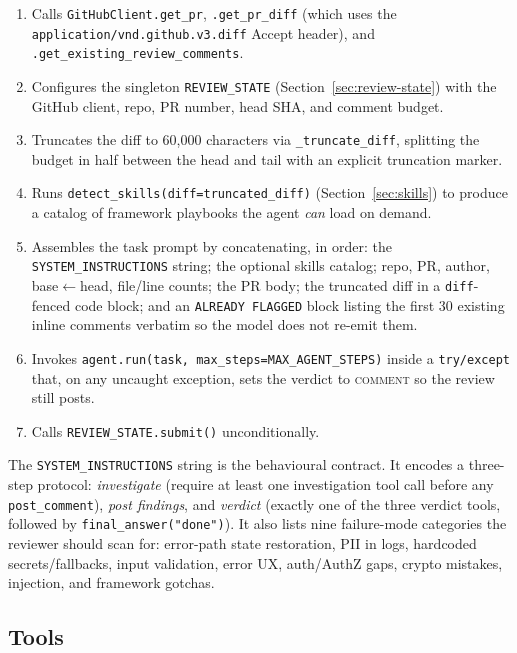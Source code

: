 \documentclass[11pt,a4paper]{article}
\newcommand{\code}[1]{\texttt{\small #1}}
\begin{document}
\begin{enumerate}[leftmargin=*]
  \item Calls \code{GitHubClient.get\_pr}, \code{.get\_pr\_diff} (which uses
        the \code{application/vnd.github.v3.diff} Accept header), and
        \code{.get\_existing\_review\_comments}.
  \item Configures the singleton \code{REVIEW\_STATE}
        (Section~\ref{sec:review-state}) with the GitHub client, repo, PR
        number, head SHA, and comment budget.
  \item Truncates the diff to 60{,}000 characters via \code{\_truncate\_diff},
        splitting the budget in half between the head and tail with an
        explicit truncation marker.
  \item Runs \code{detect\_skills(diff=truncated\_diff)}
        (Section~\ref{sec:skills}) to produce a catalog of framework
        playbooks the agent \emph{can} load on demand.
  \item Assembles the task prompt by concatenating, in order: the
        \code{SYSTEM\_INSTRUCTIONS} string; the optional skills catalog;
        repo, PR, author, base$\leftarrow$head, file/line counts; the PR body;
        the truncated diff in a \code{diff}-fenced code block; and an
        \code{ALREADY FLAGGED} block listing the first 30 existing inline
        comments verbatim so the model does not re-emit them.
  \item Invokes \code{agent.run(task, max\_steps=MAX\_AGENT\_STEPS)} inside
        a \code{try/except} that, on any uncaught exception, sets the
        verdict to \textsc{comment} so the review still posts.
  \item Calls \code{REVIEW\_STATE.submit()} unconditionally.
\end{enumerate}

The \code{SYSTEM\_INSTRUCTIONS} string is the behavioural contract. It
encodes a three-step protocol: \emph{investigate} (require at least one
investigation tool call before any \code{post\_comment}), \emph{post
findings}, and \emph{verdict} (exactly one of the three verdict tools,
followed by \code{final\_answer("done")}). It also lists nine failure-mode
categories the reviewer should scan for: error-path state restoration, PII
in logs, hardcoded secrets/fallbacks, input validation, error UX,
auth/AuthZ gaps, crypto mistakes, injection, and framework gotchas.

\subsection{Tools}
\label{sec:tools}
\end{document}
